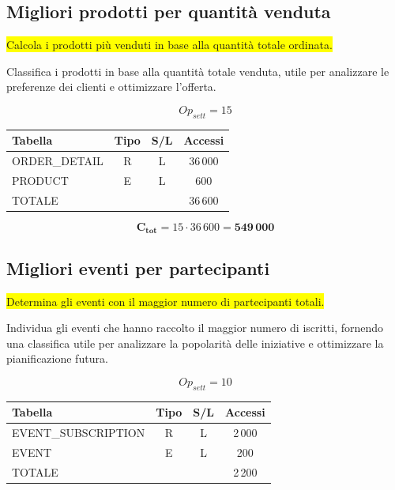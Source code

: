 \documentclass[a4paper,12pt]{report}
\begin{document}
\subsection*{Migliori prodotti per quantità venduta} \label{op2}
\colorbox{yellow}{Calcola i prodotti più venduti in base alla
quantità totale ordinata.}

Classifica i prodotti in base alla quantità totale venduta, utile per
analizzare le preferenze dei clienti e ottimizzare l'offerta.

$$Op_{sett} = 15$$

\begin{table}[H]
  \centering
  \small
  \renewcommand{\arraystretch}{1.15}
  \begin{tabularx}{0.7\textwidth}{|X|c|c|c|}
    \hline
    \rowcolor{gray!20}
    \textbf{Tabella} & \textbf{Tipo} & \textbf{S/L} & \textbf{Accessi} \\
    \hline
    ORDER\_DETAIL & R & L & 36\,000 \\
    PRODUCT & E & L & 600 \\
    \hline
    \rowcolor{gray!20}
    TOTALE & & & 36\,600 \\
    \hline
  \end{tabularx}
  \vspace{-1em}
\end{table}

$$\mathbf{C_{tot}} = 15 \cdot 36\,600 = \mathbf{549\,000}$$

\subsection*{Migliori eventi per partecipanti} \label{op3}
\colorbox{yellow}{Determina gli eventi con il maggior numero di
partecipanti totali.}

Individua gli eventi che hanno raccolto il maggior numero di
iscritti, fornendo una classifica utile per analizzare la popolarità
delle iniziative e ottimizzare la pianificazione futura.

$$Op_{sett} = 10$$

\begin{table}[H]
  \centering
  \small
  \renewcommand{\arraystretch}{1.15}
  \begin{tabularx}{0.7\textwidth}{|X|c|c|c|}
    \hline
    \rowcolor{gray!20}
    \textbf{Tabella} & \textbf{Tipo} & \textbf{S/L} & \textbf{Accessi}  \\
    \hline
    EVENT\_SUBSCRIPTION & R & L & 2\,000 \\
    EVENT & E & L & 200 \\
    \hline
    \rowcolor{gray!20}
    TOTALE & & & 2\,200 \\
    \hline
  \end{tabularx}
  \vspace{-1em}
\end{table}
\end{document}
